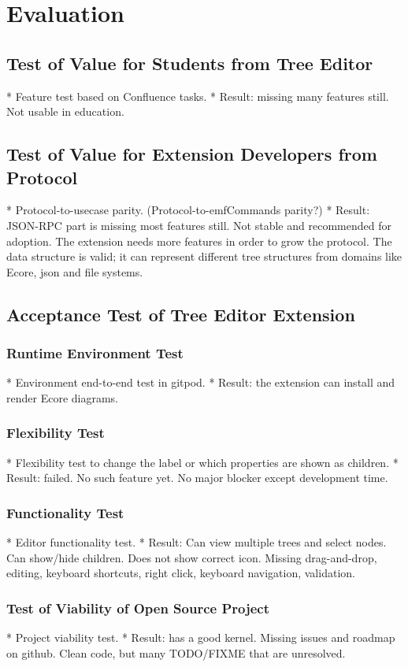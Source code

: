 \chapter{Evaluation}\label{chap:evaluation}


\section{Test of Value for Students from Tree Editor}

* Feature test based on Confluence tasks.
  * Result: missing many features still. Not usable in education.

\section{Test of Value for Extension Developers from Protocol}
* Protocol-to-usecase parity. (Protocol-to-emfCommands parity?)
  * Result: JSON-RPC part is missing most features still. Not stable and recommended for adoption. The extension needs more features in order to grow the protocol. The data structure is valid; it can represent different tree structures from domains like Ecore, json and file systems.

\section{Acceptance Test of Tree Editor Extension}

\subsection{Runtime Environment Test}
* Environment end-to-end test in gitpod.
  * Result: the extension can install and render Ecore diagrams.

\subsection{Flexibility Test}
* Flexibility test to change the label or which properties are shown as children.
  * Result: failed. No such feature yet. No major blocker except development time.

\subsection{Functionality Test}
* Editor functionality test.
  * Result: Can view multiple trees and select nodes. Can show/hide children. Does not show correct icon. Missing drag-and-drop, editing, keyboard shortcuts, right click, keyboard navigation, validation.

\subsection{Test of Viability of Open Source Project}
* Project viability test.
  * Result: has a good kernel. Missing issues and roadmap on github. Clean code, but many TODO/FIXME that are unresolved. 
  